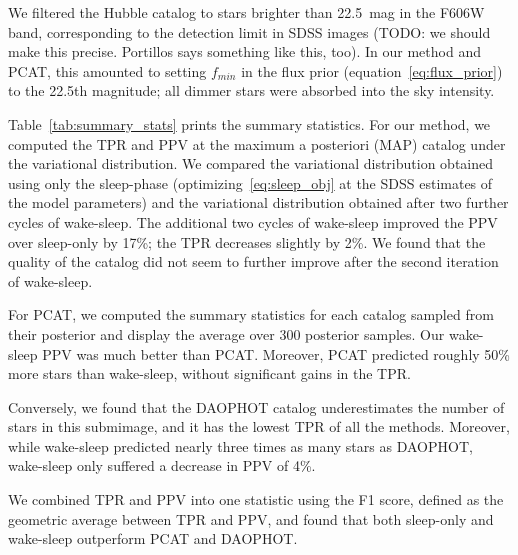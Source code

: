 We filtered the Hubble catalog to stars brighter than 22.5~mag in the F606W band, corresponding to the detection limit in SDSS images  
(TODO: we should make this precise. Portillos says something like this, too). In our method and PCAT, this amounted to setting $f_{min}$ in the flux prior (equation~\ref{eq:flux_prior})
to the 22.5th magnitude; all dimmer stars were absorbed into the sky intensity. 

Table~\ref{tab:summary_stats} prints the summary statistics. For our method, we  computed the TPR and PPV at the maximum a posteriori (MAP) catalog under
the variational distribution. 
We compared the variational distribution obtained using only the sleep-phase (optimizing~\eqref{eq:sleep_obj} at the SDSS estimates of the model parameters)
and the variational distribution obtained after two further cycles of wake-sleep. The additional two cycles of wake-sleep improved the PPV 
over sleep-only by 17\%; the TPR decreases slightly by 2\%. 
We found that the quality of the catalog did not seem to further improve after the second iteration of wake-sleep. 

For PCAT, we computed the summary statistics for each catalog sampled from their posterior and display the average over 300 posterior samples. 
Our wake-sleep PPV was much better than PCAT. 
Moreover, PCAT predicted roughly 50\% more stars than 
wake-sleep, without significant gains in the TPR. 






Conversely, we found that the DAOPHOT catalog underestimates the number of stars in this submimage, and it has the lowest TPR of all the methods. Moreover, while wake-sleep predicted nearly three times as many stars as DAOPHOT, 
wake-sleep only suffered a decrease in PPV of 4\%. 

We combined TPR and PPV into one statistic using the F1 score,
defined as the geometric average between TPR and PPV, and found that both 
sleep-only and wake-sleep outperform PCAT and DAOPHOT.


